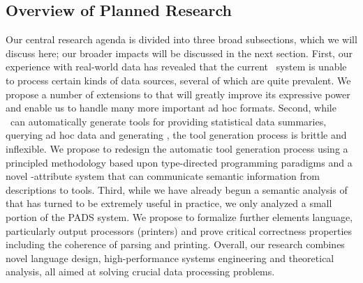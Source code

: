 \documentclass[11pt]{article}
\begin{document}

% 


% 

\subsection{Overview of Planned Research}
\label{ssec:sow}

Our central research agenda is divided into three broad subsections,
which we will discuss here; our broader impacts will be discussed in the next 
section.  First, our experience with real-world data has revealed that
the current \pads{}\ system is unable to process certain kinds of
data sources, several of which are quite prevalent.  We 
propose a number of extensions to \pads{} 
that will greatly improve its expressive power and enable
us to handle many more important ad hoc formats.  Second,
while \pads{}\ can automatically generate tools for providing
statistical data summaries, querying ad hoc data and generating
\xml, the tool generation process is brittle and inflexible.  We 
propose to redesign
the automatic tool generation process using a principled methodology
based upon type-directed programming paradigms and
a novel \pads{}-attribute system that can communicate
semantic information from descriptions to tools.  
Third, while we have already begun a
semantic analysis of \pads{} that has turned to be extremely useful in 
practice, we only analyzed a small portion of the PADS system.  
We propose to formalize further elements language, particularly
output processors (printers) and prove critical \pads{} correctness
properties including the coherence of parsing and printing.  
Overall, our research combines novel language
design, high-performance systems engineering and theoretical analysis,
all aimed at solving crucial data processing problems.
\end{document}
